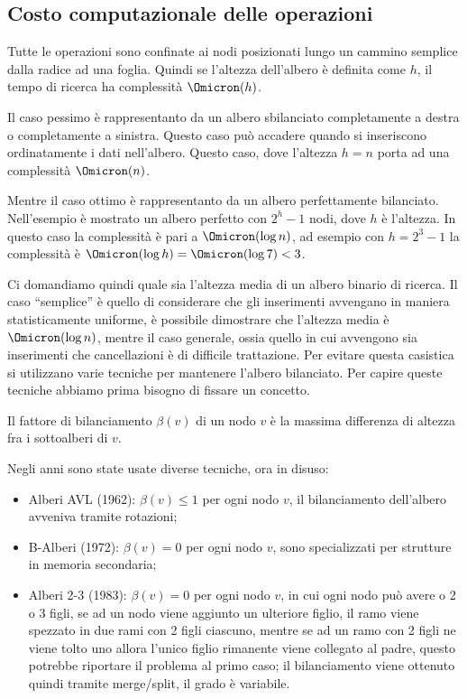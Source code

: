 \clearpage
\subsection*{Costo computazionale delle operazioni}

Tutte le operazioni sono confinate ai nodi posizionati lungo un cammino semplice dalla radice ad una foglia.
Quindi se l'altezza dell'albero è definita come \(h\), il tempo di ricerca ha complessità \(\Omicron(h)\).

Il caso pessimo è rappresentanto da un albero sbilanciato completamente a destra o completamente a sinistra.
Questo caso può accadere quando si inseriscono ordinatamente i dati nell'albero.
Questo caso, dove l'altezza \(h = n\) porta ad una complessità \(\Omicron(n)\).

Mentre il caso ottimo è rappresentanto da un albero perfettamente bilanciato.
Nell'esempio è mostrato un albero perfetto con \(2^h - 1\) nodi, dove \(h\) è l'altezza.
In questo caso la complessità è pari a \(\Omicron(\log n)\), ad esempio con \(h = 2^3 - 1\) la complessità è \(\Omicron(\log h) = \Omicron(\log 7) < 3\).

Ci domandiamo quindi quale sia l'altezza media di un albero binario di ricerca.
Il caso \enquote{semplice} è quello di considerare che gli inserimenti avvengano in maniera statisticamente uniforme, è possibile dimostrare che l'altezza media è \(\Omicron(\log n)\), mentre il caso generale, ossia quello in cui avvengono sia inserimenti che cancellazioni è di difficile trattazione. Per evitare questa casistica si utilizzano varie tecniche per mantenere l'albero bilanciato.
Per capire queste tecniche abbiamo prima bisogno di fissare un concetto.
\begin{definition}
Il fattore di bilanciamento \(\beta(v)\) di un nodo \(v\) è la massima differenza di altezza fra i sottoalberi di \(v\).
\end{definition}

Negli anni sono state usate diverse tecniche, ora in disuso:
\begin{itemize}
	\item Alberi AVL (1962): \(\beta(v) \leqslant 1\) per ogni nodo \(v\), il bilanciamento dell'albero avveniva tramite rotazioni;
	\item B-Alberi (1972): \(\beta(v) = 0\) per ogni nodo \(v\), sono specializzati per strutture in memoria secondaria;
	\item Alberi 2-3 (1983): \(\beta(v) = 0\) per ogni nodo \(v\), in cui ogni nodo può avere o 2 o 3 figli, se ad un nodo viene aggiunto un ulteriore figlio, il ramo viene spezzato in due rami con 2 figli ciascuno, mentre se ad un ramo con 2 figli ne viene tolto uno allora l'unico figlio rimanente viene collegato al padre, questo potrebbe riportare il problema al primo caso; il bilanciamento viene ottenuto quindi tramite merge/split, il grado è variabile.
\end{itemize}


